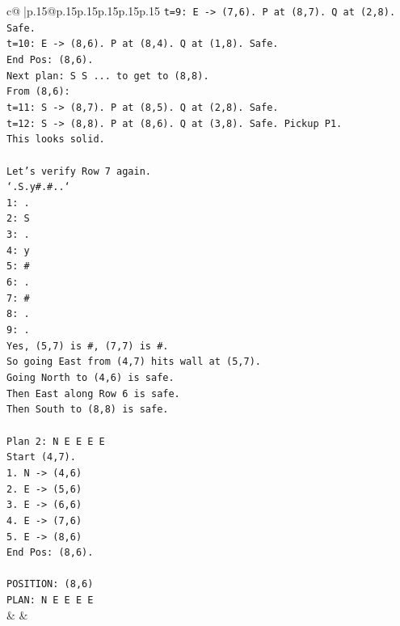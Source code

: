 \documentclass{article}
\begin{document}
{\begin{supertabular}{c@{$\;$}|p{.15\linewidth}@{}p{.15\linewidth}p{.15\linewidth}p{.15\linewidth}p{.15\linewidth}p{.15\linewidth}}
{{{\texttt{t=9: E {-}> (7,6). P at (8,7). Q at (2,8). Safe.} \\
\texttt{t=10: E {-}> (8,6). P at (8,4). Q at (1,8). Safe.} \\
\texttt{End Pos: (8,6).} \\
\texttt{Next plan: S S ... to get to (8,8).} \\
\texttt{From (8,6):} \\
\texttt{t=11: S {-}> (8,7). P at (8,5). Q at (2,8). Safe.} \\
\texttt{t=12: S {-}> (8,8). P at (8,6). Q at (3,8). Safe. Pickup P1.} \\
\texttt{This looks solid.} \\
\\ 
\texttt{Let's verify Row 7 again.} \\
\texttt{`.S.y\#.\#..`} \\
\texttt{1: .} \\
\texttt{2: S} \\
\texttt{3: .} \\
\texttt{4: y} \\
\texttt{5: \#} \\
\texttt{6: .} \\
\texttt{7: \#} \\
\texttt{8: .} \\
\texttt{9: .} \\
\texttt{Yes, (5,7) is \#, (7,7) is \#.} \\
\texttt{So going East from (4,7) hits wall at (5,7).} \\
\texttt{Going North to (4,6) is safe.} \\
\texttt{Then East along Row 6 is safe.} \\
\texttt{Then South to (8,8) is safe.} \\
\\ 
\texttt{Plan 2: N E E E E} \\
\texttt{Start (4,7).} \\
\texttt{1. N {-}> (4,6)} \\
\texttt{2. E {-}> (5,6)} \\
\texttt{3. E {-}> (6,6)} \\
\texttt{4. E {-}> (7,6)} \\
\texttt{5. E {-}> (8,6)} \\
\texttt{End Pos: (8,6).} \\
\\ 
\texttt{POSITION: (8,6)} \\
\texttt{PLAN: N E E E E} \\
            }
        }
    }
    & & \\ \\


\end{supertabular}}
\end{document}
